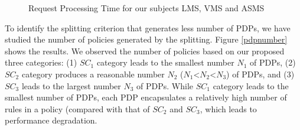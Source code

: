  \begin{figure}[h!]
  \centering
  \caption{Request Processing Time for our subjects LMS, VMS and ASMS}
  \label{fig:processing time}
\end{figure}
 

To identify the splitting criterion that generates less number of PDPs, we have studied the number of policies generated by the
 splitting. Figure \ref{pdpnumber} shows the results.
We observed the number of policies based on our proposed three categories: (1) $SC_{1}$ category leads to the smallest number $N_1$ of PDPs, 
(2) $SC_{2}$ category produces a reasonable number
 $N_2$ ($N_1$<$N_2$<$N_3$) of PDPs, and (3) $SC_{3}$ leads to the largest number $N_3$ of PDPs.
While $SC_{1}$ category leads to the smallest number of PDPs, each PDP encapsulates a relatively high number of rules in a policy (compared
with that of $SC_{2}$ and $SC_{3}$, which leads to performance degradation. 

